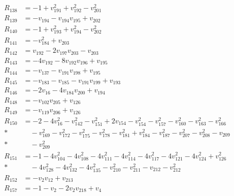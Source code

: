 \begin{align*}
R_{138}&=-1+v_{191}^{2}+v_{192}^{2}-v_{201}^{2}\\[2pt]
R_{139}&=-v_{194}-v_{194}v_{195}+v_{202}\\[2pt]
R_{140}&=-1+v_{193}^{2}+v_{194}^{2}-v_{202}^{2}\\[2pt]
R_{141}&=-v_{184}^{2}+v_{203}\\[2pt]
R_{142}&=v_{192}-2v_{197}v_{203}-v_{203}\\[2pt]
R_{143}&=-4v_{192}-8v_{192}v_{196}+v_{195}\\[2pt]
R_{144}&=-v_{137}-v_{191}v_{198}+v_{195}\\[2pt]
R_{145}&=-v_{183}-v_{185}-v_{191}v_{199}+v_{193}\\[2pt]
R_{146}&=-2v_{16}-4v_{184}v_{200}+v_{194}\\[2pt]
R_{148}&=-v_{102}v_{205}+v_{126}\\[2pt]
R_{149}&=-v_{119}v_{206}+v_{126}\\[2pt]
R_{150}&=-2-4v_{16}^{2}-v_{142}^{2}-v_{151}^{2}+2v_{154}-v_{154}^{2}-v_{157}^{2}-v_{160}^{2}-v_{163}^{2}-v_{166}^{2}\\*
&\quad-v_{169}^{2}-v_{172}^{2}-v_{175}^{2}-v_{178}^{2}-v_{181}^{2}+v_{184}^{2}-v_{187}^{2}-v_{207}^{2}-v_{208}^{2}-v_{209}\\*
&\quad-v_{209}^{2}\\[2pt]
R_{151}&=-1-4v_{104}^{2}-4v_{108}^{2}-4v_{111}^{2}-4v_{114}^{2}-4v_{117}^{2}-4v_{121}^{2}-4v_{124}^{2}+v_{126}^{2}\\*
&\quad-4v_{128}^{2}-4v_{132}^{2}-4v_{135}^{2}-v_{210}^{2}-v_{211}^{2}-v_{212}-v_{212}^{2}\\[2pt]
R_{152}&=-v_{2}v_{12}+v_{213}\\[2pt]
R_{157}&=-1-v_{2}-2v_{2}v_{218}+v_{4}\\[2pt]
\end{align*}
\endgroup

